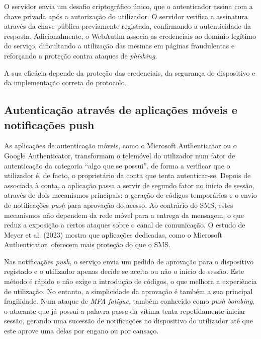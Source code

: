 \hspace{1cm} O servidor envia um desafio criptográfico único, que o autenticador assina com a chave privada após a autorização do utilizador. O servidor verifica a assinatura através da chave pública previamente registada, confirmando a autenticidade da resposta. Adicionalmente, o WebAuthn associa as credenciais ao domínio legítimo do serviço, dificultando a utilização das mesmas em páginas fraudulentas e reforçando a proteção contra ataques de \textit{phishing}.

\hspace{1cm} A sua eficácia depende da proteção das credenciais, da segurança do dispositivo e da implementação correta do protocolo.

\subsection{Autenticação através de aplicações móveis e notificações push}
 
\hspace{1cm} As aplicações de autenticação móveis, como o Microsoft Authenticator ou o Google Authenticator, transformam o telemóvel do utilizador num fator de autenticação da categoria ``algo que se possui'', de forma a verificar que o utilizador é, de facto, o proprietário da conta que tenta autenticar-se. Depois de associada à conta, a aplicação passa a servir de segundo fator no início de sessão, através de dois mecanismos principais: a geração de códigos temporários e o envio de notificações \textit{push} para aprovação do acesso. Ao contrário do SMS, estes mecanismos não dependem da rede móvel para a entrega da mensagem, o que reduz a exposição a certos ataques sobre o canal de comunicação. O estudo de Meyer et al. (2023) mostra que aplicações dedicadas, como o Microsoft Authenticator, oferecem mais proteção do que o SMS.
 
\hspace{1cm} Nas notificações \textit{push}, o serviço envia um pedido de aprovação para o dispositivo registado e o utilizador apenas decide se aceita ou não o início de sessão. Este método é rápido e não exige a introdução de códigos, o que melhora a experiência de utilização. No entanto, a simplicidade da aprovação é também a sua principal fragilidade. Num ataque de \textit{MFA fatigue}, também conhecido como \textit{push bombing}, o atacante que já possui a palavra-passe da vítima tenta repetidamente iniciar sessão, gerando uma sucessão de notificações no dispositivo do utilizador até que este aprove uma delas por engano ou por cansaço.
 
